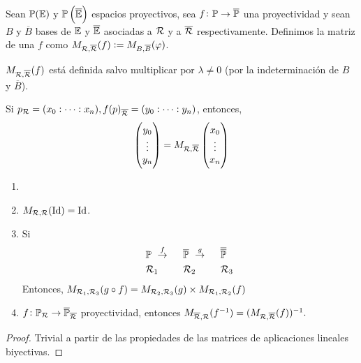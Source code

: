 \begin{defi}
    Sean $\mathbb{P}(\mathbb{E})$ y $\mathbb{P}\left( \overline{\mathbb{E}} \right)$ espacios proyectivos, sea $f \colon \mathbb{P} \to \overline{\mathbb{P}}$ una proyectividad y sean $B$ y $\overline{B}$ bases de $\mathbb{E}$ y $\overline{\mathbb{E}}$ asociadas a $\mathcal{R}$ y a $\overline{\mathcal{R}}$ respectivamente. Definimos la matriz de una $f$ como $M_{\mathcal{R}, \overline{\mathcal{R}}} (f) := M_{B, \overline{B}}(\varphi)$.
\end{defi}
\begin{obs}
$M_{\mathcal{R}, \overline{\mathcal{R}}} (f)$ está definida salvo multiplicar por $\lambda \neq 0$ (por la indeterminación de $B$ y $\overline{B}$).
\end{obs}
\begin{obs}
    Si $p_{\mathcal{R}} = (x_0 : \dots : x_n), f(p)_{\overline{\mathcal{R}}} = (y_0 : \dots : y_n)$, entonces,
    \[
    \begin{pmatrix} y_0 \\ \vdots \\ y_n \end{pmatrix} = M_{\mathcal{R}, \overline{\mathcal{R}}} \begin{pmatrix} x_0 \\ \vdots \\ x_n \end{pmatrix}
    \]
\end{obs}
\begin{prop}[Propiedades]
    \begin{enumerate}
        \item[]
        \item $M_{\mathcal{R}, \mathcal{R}}(\operatorname{Id}) = \operatorname{Id}$.
        \item Si
            \begin{alignat*}{3}
                &\mathbb{P} \text{ } \stackrel{f}{\to} \text{  } &&\overline{\mathbb{P}} \text{ } \stackrel{g}{\to} \text{  } &&\overline{\overline{\mathbb{P}}} \\
                &\mathcal{R}_1 &&\mathcal{R}_2 &&\mathcal{R}_3
            \end{alignat*}
            Entonces, $M_{\mathcal{R}_1, \mathcal{R}_3}(g \circ f) = M_{\mathcal{R}_2, \mathcal{R}_3}(g) \times M_{\mathcal{R}_1, \mathcal{R}_2}(f)$
        \item $f\colon\mathbb{P}_{\mathcal{R}} \to \overline{\mathbb{P}}_{\overline{\mathcal{R}}}$ proyectividad, entonces $M_{\overline{\mathcal{R}}, \mathcal{R}}(f^{-1}) = (M_{\mathcal{R}, \overline{\mathcal{R}}} (f))^{-1}.$
    \end{enumerate}
\end{prop}
\begin{proof}
    Trivial a partir de las propiedades de las matrices de aplicaciones lineales biyectivas.
\end{proof}
